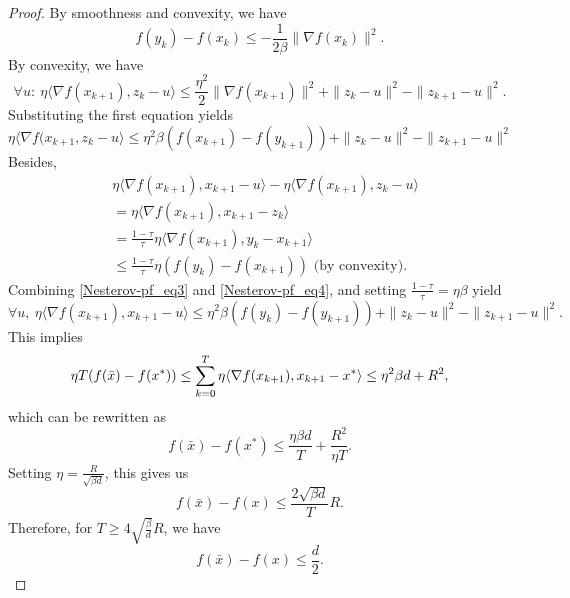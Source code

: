 \begin{proof}
By smoothness and convexity, we have
\begin{equation}
f(y_k) - f(x_k) \leq -\frac{1}{2 \beta} \|\nabla f(x_k) \|^2. \label{Nesterov-pf_smoothness_and_convexity}
\end{equation}
By convexity, we have
\begin{equation*}
\forall u: \ \eta  \langle \nabla f(x_{k+1}), z_k - u \rangle \leq \frac{\eta^2}{2} \|\nabla f(x_{k+1})\|^2 + \|z_k - u \|^2 - \|z_{k+1} - u \|^2.
\end{equation*}
Substituting the first equation yields
\begin{equation}
\eta \langle \nabla f(x_{k+1}, z_k - u \rangle \leq \eta^2 \beta (f(x_{k+1}) - f(y_{k+1})) + \|z_k - u\|^2 - \|z_{k+1} - u \|^2 \label{Nesterov-pf_eq3}
\end{equation}
\medskip
Besides,
\begin{align}
&\eta \langle \nabla f(x_{k+1}), x_{k+1} - u\rangle - \eta \langle \nabla f(x_{k+1}), z_k - u\rangle \nonumber\\
&= \eta \langle\nabla f(x_{k+1}), x_{k+1} - z_k\rangle \nonumber\\
&= \frac{1-\tau}{\tau}  \eta \langle\nabla f(x_{k+1}), y_k - x_{k+1}\rangle \nonumber\\
&\leq \frac{1-\tau}{\tau} \eta (f(y_k) - f(x_{k+1})) \text{ (by convexity)}. \label{Nesterov-pf_eq4}
\end{align}
\medskip
Combining  \eqref{Nesterov-pf_eq3} and \eqref{Nesterov-pf_eq4}, and setting $\frac{1-\tau}{\tau} = \eta \beta$ yield
\begin{equation*}
\forall u,\ \eta \langle\nabla f(x_{k+1}), x_{k+1} - u\rangle \leq \eta^2 \beta (f(y_k) - f(y_{k+1})) + \|z_k - u\|^2 - \|z_{k+1} - u\|^2.
\end{equation*}
This implies
\begin{equation*}
\eta T (f(\bar{x}) - f(x^*)) \leq \sum_{k=0}^T \eta \langle\nabla f(x_{k+1}), x_{k+1} - x^*\rangle\\
\leq \eta^2 \beta d + R^2,
\end{equation*}
which can be rewritten as
\begin{equation*}
f(\bar{x}) - f(x^*) \leq \frac{\eta \beta d}{T} + \frac{R^2}{\eta T}.
\end{equation*}
Setting $\eta = \frac{R}{\sqrt{\beta d}}$, this gives us
\begin{equation*}
f(\bar{x}) - f(x) \leq \frac{2 \sqrt{\beta d}}{T} R.
\end{equation*}
Therefore, for $T \geq 4 \sqrt{\frac{\beta}{d}} R$, we have
\begin{equation*}
f(\bar{x}) - f(x) \leq \frac{d}{2}.
\end{equation*}
\end{proof}

